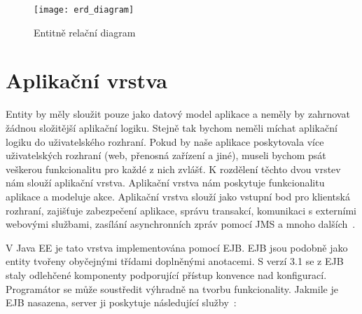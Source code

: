\documentclass[122pt,oneside]{fithesis}
\begin{document}
\begin{figure}[!ht]
\centering
\texttt{[image: erd\_diagram]}
\caption{Entitně relační diagram}
\label{img:erd}
\end{figure}


\chapter{Aplikační vrstva}
Entity by měly sloužit pouze jako datový model aplikace a neměly by zahrnovat žádnou složitější aplikační logiku. Stejně tak bychom neměli míchat aplikační logiku do uživatelského rozhraní. Pokud by naše aplikace poskytovala více uživatelských rozhraní (web, přenosná zařízení a jiné), museli bychom psát veškerou funkcionalitu pro každé z nich zvlášť. K rozdělení těchto dvou vrstev nám slouží aplikační vrstva. Aplikační vrstva nám poskytuje funkcionalitu aplikace a modeluje akce. Aplikační vrstva slouží jako vstupní bod pro klientská rozhraní, zajišťuje zabezpečení aplikace, správu transakcí, komunikaci s externími webovými službami, zasílání asynchronních zpráv pomocí JMS a mnoho dalších~\cite{goncalves09}. 

V Java EE je tato vrstva implementována pomocí EJB. EJB jsou podobně jako entity tvořeny obyčejnými třídami doplněnými anotacemi. S verzí 3.1 se z EJB staly odlehčené komponenty podporující přístup konvence nad konfigurací. Programátor se může soustředit výhradně na tvorbu funkcionality. Jakmile je EJB nasazena,  server ji poskytuje následující služby~\cite{wikiEJB}:
\end{document}
